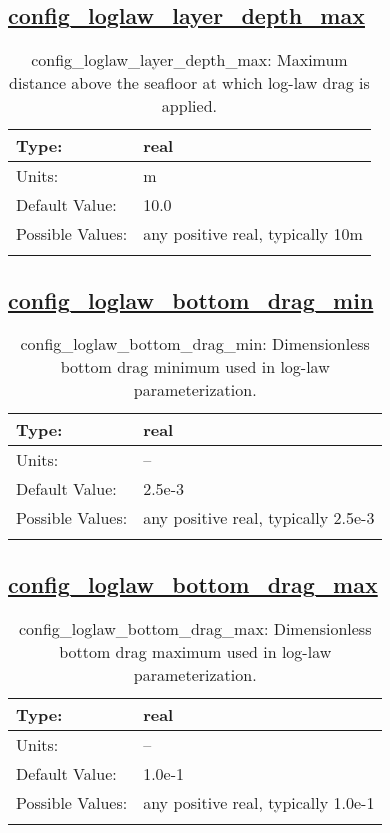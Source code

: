 \subsection[config\_loglaw\_layer\_depth\_max]{\hyperref[sec:nm_tab_bottom_drag]{config\_loglaw\_layer\_depth\_max}}
\label{subsec:nm_sec_config_loglaw_layer_depth_max}
\begin{center}
\begin{longtable}{| p{2.0in} || p{4.0in} |}
    \hline
    Type: & real \\
    \hline
    Units: & \si{m} \\
    \hline
    Default Value: & 10.0 \\
    \hline
    Possible Values: & any positive real, typically 10m \\
    \hline
    \caption{config\_loglaw\_layer\_depth\_max: Maximum distance above the seafloor at which log-law drag is applied.}
\end{longtable}
\end{center}
\subsection[config\_loglaw\_bottom\_drag\_min]{\hyperref[sec:nm_tab_bottom_drag]{config\_loglaw\_bottom\_drag\_min}}
\label{subsec:nm_sec_config_loglaw_bottom_drag_min}
\begin{center}
\begin{longtable}{| p{2.0in} || p{4.0in} |}
    \hline
    Type: & real \\
    \hline
    Units: & -- \\
    \hline
    Default Value: & 2.5e-3 \\
    \hline
    Possible Values: & any positive real, typically 2.5e-3 \\
    \hline
    \caption{config\_loglaw\_bottom\_drag\_min: Dimensionless bottom drag minimum used in log-law parameterization.}
\end{longtable}
\end{center}
\subsection[config\_loglaw\_bottom\_drag\_max]{\hyperref[sec:nm_tab_bottom_drag]{config\_loglaw\_bottom\_drag\_max}}
\label{subsec:nm_sec_config_loglaw_bottom_drag_max}
\begin{center}
\begin{longtable}{| p{2.0in} || p{4.0in} |}
    \hline
    Type: & real \\
    \hline
    Units: & -- \\
    \hline
    Default Value: & 1.0e-1 \\
    \hline
    Possible Values: & any positive real, typically 1.0e-1 \\
    \hline
    \caption{config\_loglaw\_bottom\_drag\_max: Dimensionless bottom drag maximum used in log-law parameterization.}
\end{longtable}
\end{center}
